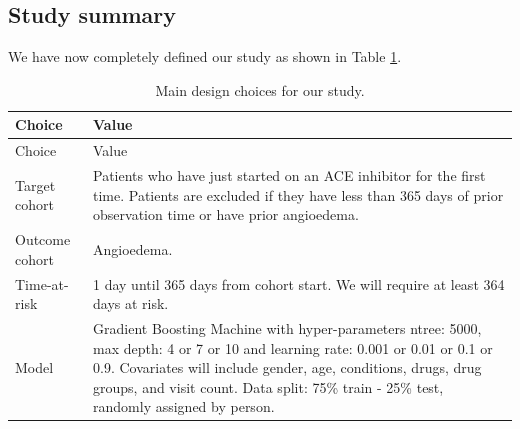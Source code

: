 \documentclass[11pt]{book}
\theoremstyle{definition}
\theoremstyle{definition}
\theoremstyle{definition}
\theoremstyle{remark}
\begin{document}
\hypertarget{study-summary-1}{%
\subsection{Study summary}\label{study-summary-1}}

We have now completely defined our study as shown in Table \ref{tab:plpSummary}.

\begin{longtable}[]{@{}ll@{}}
\caption{\label{tab:plpSummary} Main design choices for our study.}\tabularnewline
\toprule
\begin{minipage}[b]{0.23\columnwidth}\raggedright
Choice\strut
\end{minipage} & \begin{minipage}[b]{0.72\columnwidth}\raggedright
Value\strut
\end{minipage}\tabularnewline
\midrule
\endfirsthead
\toprule
\begin{minipage}[b]{0.23\columnwidth}\raggedright
Choice\strut
\end{minipage} & \begin{minipage}[b]{0.72\columnwidth}\raggedright
Value\strut
\end{minipage}\tabularnewline
\midrule
\endhead
\begin{minipage}[t]{0.23\columnwidth}\raggedright
Target cohort\strut
\end{minipage} & \begin{minipage}[t]{0.72\columnwidth}\raggedright
Patients who have just started on an ACE inhibitor for the first time. Patients are excluded if they have less than 365 days of prior observation time or have prior angioedema.\strut
\end{minipage}\tabularnewline
\begin{minipage}[t]{0.23\columnwidth}\raggedright
Outcome cohort\strut
\end{minipage} & \begin{minipage}[t]{0.72\columnwidth}\raggedright
Angioedema.\strut
\end{minipage}\tabularnewline
\begin{minipage}[t]{0.23\columnwidth}\raggedright
Time-at-risk\strut
\end{minipage} & \begin{minipage}[t]{0.72\columnwidth}\raggedright
1 day until 365 days from cohort start. We will require at least 364 days at risk.\strut
\end{minipage}\tabularnewline
\begin{minipage}[t]{0.23\columnwidth}\raggedright
Model\strut
\end{minipage} & \begin{minipage}[t]{0.72\columnwidth}\raggedright
Gradient Boosting Machine with hyper-parameters ntree: 5000, max depth: 4 or 7 or 10 and learning rate: 0.001 or 0.01 or 0.1 or 0.9. Covariates will include gender, age, conditions, drugs, drug groups, and visit count. Data split: 75\% train - 25\% test, randomly assigned by person.\strut
\end{minipage}\tabularnewline
\bottomrule
\end{longtable}
\end{document}
